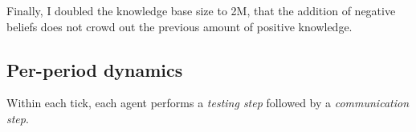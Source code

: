 \documentclass{article}
\begin{document}
Finally, I doubled the knowledge base size to 2M, that the addition of negative beliefs does not crowd out the previous amount of positive knowledge.


\subsection{Per-period dynamics}

Within each tick, each agent performs a \emph{testing step} followed by a \emph{communication step}.
\end{document}
